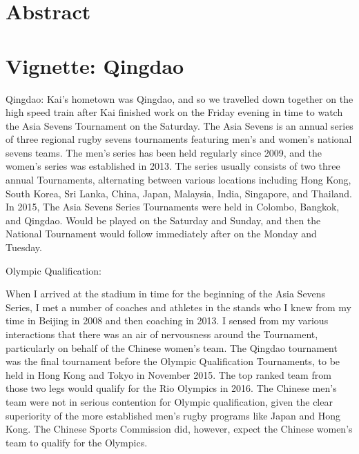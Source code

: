 
\section{Abstract}


\section{Vignette: Qingdao}
Qingdao:
Kai's hometown was Qingdao, and so we travelled down together on the high speed train after Kai finished work on the Friday evening in time to watch the Asia Sevens Tournament on the Saturday.  The Asia Sevens is an annual series of three regional rugby sevens tournaments featuring men's and women's national sevens teams.  The men's series has been held regularly since 2009, and the women's series was established in 2013. The series usually consists of two three annual Tournaments, alternating between various locations including Hong Kong, South Korea, Sri Lanka, China, Japan, Malaysia, India, Singapore, and Thailand.  In 2015, The Asia Sevens Series Tournaments were held in Colombo, Bangkok, and Qingdao. Would be played on the Saturday and Sunday, and then the National Tournament would follow immediately after on the Monday and Tuesday.


Olympic Qualification:

When I arrived at the stadium in time for the beginning of the Asia Sevens Series, I met a number of coaches and athletes in the stands who I knew from my time in Beijing in 2008 and then coaching in 2013. I sensed from my various interactions that there was an air of nervousness around the Tournament, particularly on behalf of the Chinese women's team.   The Qingdao tournament was the final tournament before the Olympic Qualification Tournaments, to be held in Hong Kong and Tokyo in November 2015.  The top ranked team from those two legs would qualify for the Rio Olympics in 2016.  The Chinese men's team were not in serious contention for Olympic qualification, given the clear superiority of the more established men's rugby programs like Japan and Hong Kong. The Chinese Sports Commission did, however, expect the Chinese women's team to qualify for the Olympics.

